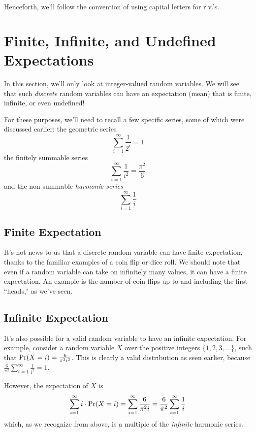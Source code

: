 Henceforth, we'll follow the convention of using capital letters for r.v.'s.




\section{Finite, Infinite, and Undefined Expectations}

In this section, we'll only look at integer-valued random variables. 
We will see that such \emph{discrete} random variables can have an expectation (mean) 
that is finite, infinite, or even undefined!

For these purposes, we'll need to recall a few specific series, 
some of which were discussed earlier: 
the geometric series
$$ \sum_{i=1}^\infty \frac{1}{2^i} = 1 $$
the finitely summable series
$$ \sum_{i=1}^\infty \frac{1}{i^2} = \frac{\pi^2}{6} $$
and the non-summable \emph{harmonic series}
$$ \sum_{i=1}^\infty \frac{1}{i} $$

\subsection{Finite Expectation}
It's not news to us that a discrete random variable can have finite expectation, 
thanks to the familiar examples of a coin flip or dice roll. 
We should note that even if a random variable can take on infinitely many values, it can have a finite expectation.
An example is the number of coin flips up to and including the first ``heads," as we've seen.


\subsection{Infinite Expectation}
It's also possible for a valid random variable to have an infinite expectation. 
For example, consider a random variable $X$ over the positive integers $\{1, 2, 3, \dots\}$, 
such that $\mbox{\rm Pr}(X = i) = \frac{6}{\pi^2 i^2}$. 
This is clearly a valid distribution as seen earlier, because $ \frac{6}{\pi^2} \sum_{i=1}^\infty \frac{1}{i^2} = 1 $. 

However, the expectation of $X$ is
$$ \sum_{i=1}^\infty i \cdot \mbox{\rm Pr}(X = i) = \sum_{i=1}^\infty \frac{6}{\pi^2 i} = \frac{6}{\pi^2} \sum_{i=1}^\infty \frac{1}{i} $$
which, as we recognize from above, is a multiple of the \emph{infinite} harmonic series. 

